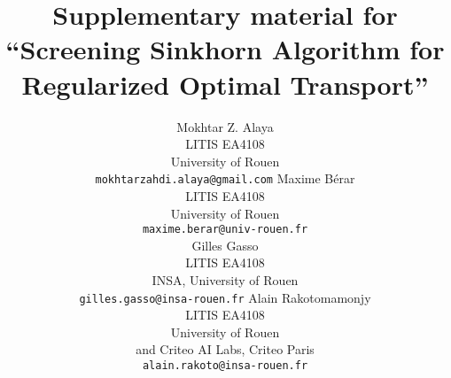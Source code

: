 \documentclass{article}
\title{Supplementary material for ``Screening Sinkhorn Algorithm for Regularized Optimal Transport''}
\begin{document}
\author{%
Mokhtar Z. Alaya \\
LITIS EA4108\\
University of Rouen\\
\texttt{mokhtarzahdi.alaya@gmail.com} 
\And
Maxime Bérar\\
LITIS EA4108\\
University of Rouen\\
\texttt{maxime.berar@univ-rouen.fr} \\
\And
Gilles Gasso \\
LITIS EA4108\\
INSA, University of Rouen\\
\texttt{gilles.gasso@insa-rouen.fr} 
\And
Alain Rakotomamonjy\\
LITIS EA4108 \\
University of Rouen\\
and Criteo AI Labs, Criteo Paris \\
\texttt{alain.rakoto@insa-rouen.fr} \\
}
\maketitle


\newpage
\small


\end{document}
